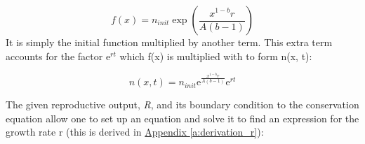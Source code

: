 \documentclass{article}
\numberwithin{equation}{section} %
\newcommand{\me}{\mathrm{e}}
\begin{document}
\begin{equation}
    f(x)=n_{init}\exp\left(\dfrac{x^{1-b}r}{A(b-1)}\right)
\end{equation}
It is simply the initial function multiplied by another term. This extra term accounts for the factor $\me^{rt}$ which f(x) is multiplied with to form n(x, t):

\begin{equation}
    n(x,t)= n_{init}\me^{\tfrac{x^{1-b}r}{A(b-1)}}\me^{rt}
\end{equation}

The given reproductive output, \textit{R}, and its boundary condition to the conservation equation allow one to set up an equation and solve it to find an expression for the growth rate r (this is derived in \hyperref[a:derivation_r]{Appendix \ref{a:derivation_r}}\label{a:derivation_r}):
\end{document}
